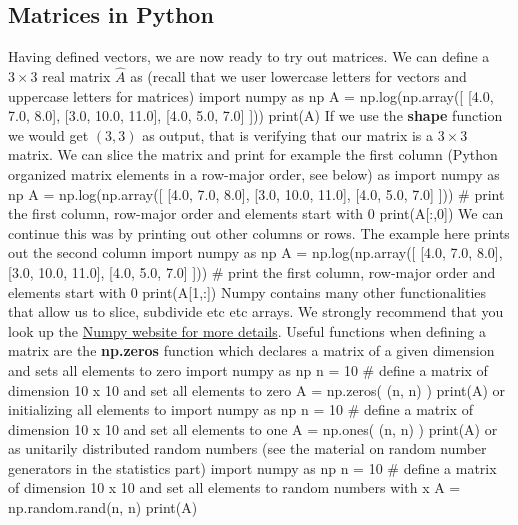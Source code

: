 \documentclass[%
oneside,                 %
final,                   %
10pt]{article}
\begin{document}
\subsection{Matrices in Python}
Having defined vectors, we are now ready to try out matrices. We can define a $3 \times 3 $ real matrix $\hat{A}$
as (recall that we user lowercase letters for vectors and uppercase letters for matrices)
\bpycod
import numpy as np
A = np.log(np.array([ [4.0, 7.0, 8.0], [3.0, 10.0, 11.0], [4.0, 5.0, 7.0] ]))
print(A)
\epycod
If we use the \textbf{shape} function we would get $(3, 3)$ as output, that is verifying that our matrix is a $3\times 3$ matrix. We can slice the matrix and print for example the first column (Python organized matrix elements in a row-major order, see below) as
\bpycod
import numpy as np
A = np.log(np.array([ [4.0, 7.0, 8.0], [3.0, 10.0, 11.0], [4.0, 5.0, 7.0] ]))
# print the first column, row-major order and elements start with 0
print(A[:,0]) 
\epycod
We can continue this was by printing out other columns or rows. The example here prints out the second column
\bpycod
import numpy as np
A = np.log(np.array([ [4.0, 7.0, 8.0], [3.0, 10.0, 11.0], [4.0, 5.0, 7.0] ]))
# print the first column, row-major order and elements start with 0
print(A[1,:]) 
\epycod
Numpy contains many other functionalities that allow us to slice, subdivide etc etc arrays. We strongly recommend that you look up the \href{{http://www.numpy.org/}}{Numpy website for more details}. Useful functions when defining a matrix are the \textbf{np.zeros} function which declares a matrix of a given dimension and sets all elements to zero
\bpycod
import numpy as np
n = 10
# define a matrix of dimension 10 x 10 and set all elements to zero
A = np.zeros( (n, n) )
print(A) 
\epycod
or initializing all elements to 
\bpycod
import numpy as np
n = 10
# define a matrix of dimension 10 x 10 and set all elements to one
A = np.ones( (n, n) )
print(A) 
\epycod
or as unitarily distributed random numbers (see the material on random number generators in the statistics part)
\bpycod
import numpy as np
n = 10
# define a matrix of dimension 10 x 10 and set all elements to random numbers with x \in [0, 1]
A = np.random.rand(n, n)
print(A) 
\epycod
\end{document}
